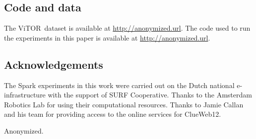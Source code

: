 \documentclass[sigconf,screen=true,anonymous]{acmart}
\newcommand{\datasetname}{\ac{ViTOR}}
\begin{document}
%
%





\maketitle










\subsection*{Code and data}
The \datasetname~dataset is available at \url{http://anonymized.url}.
The code used to run the experiments in this paper is available at \url{http://anonymized.url}.

\subsection*{Acknowledgements}
The Spark experiments in this work were carried out on the Dutch national e-infrastructure with the support of SURF Cooperative. Thanks to the Amsterdam Robotics Lab for using their computational resources. Thanks to Jamie Callan and his team for providing access to the online services for ClueWeb12. 

Anonymized.
\fi

\newpage


 
\end{document}
